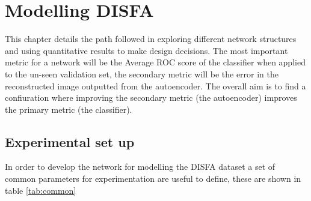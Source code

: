 \chapter{Modelling DISFA}
  This chapter details the path followed in exploring different network structures
  and using quantitative results to make design decisions.
  The most important metric for a network will be the Average ROC score of the classifier
  when applied to the un-seen validation set, the secondary metric will be the error
  in the reconstructed image outputted from the autoencoder. The overall aim is to
  find a confiuration where improving the secondary metric (the autoencoder) improves
  the primary metric (the classifier).

  \section{Experimental set up}
    In order to develop the network for modelling the DISFA dataset a set of common
    parameters for experimentation are useful to define, these are shown in table \ref{tab:common}

    \begin{table}[!h]
    \end{table}


